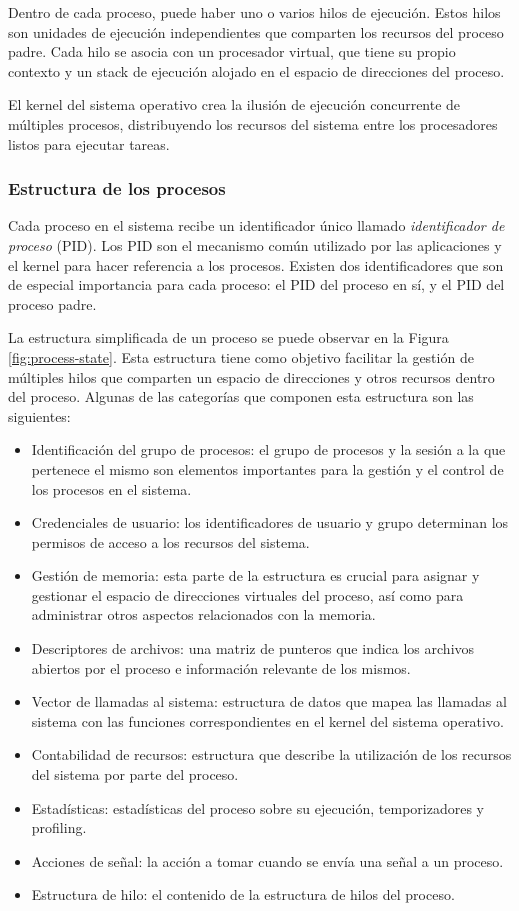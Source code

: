 Dentro de cada proceso, puede haber uno o varios hilos de ejecución. Estos hilos son unidades de ejecución independientes que comparten los recursos del proceso padre. Cada hilo se asocia con un procesador virtual, que tiene su propio contexto y un stack de ejecución alojado en el espacio de direcciones del proceso.\par

El kernel del sistema operativo crea la ilusión de ejecución concurrente de múltiples procesos, distribuyendo los recursos del sistema entre los procesadores listos para ejecutar tareas.\par

\subsubsection{Estructura de los procesos}
Cada proceso en el sistema recibe un identificador único llamado \textit{identificador de proceso} (PID). Los PID son el mecanismo común utilizado por las aplicaciones y el kernel para hacer referencia a los procesos. Existen dos identificadores que son de especial importancia para cada proceso: el PID del proceso en sí, y el PID del proceso padre.

La estructura simplificada de un proceso se puede observar en la Figura \ref{fig:process-state}. Esta estructura tiene como objetivo facilitar la gestión de múltiples hilos que comparten un espacio de direcciones y otros recursos dentro del proceso. Algunas de las categorías que componen esta estructura son las siguientes:

\begin{itemize}
    \item Identificación del grupo de procesos: el grupo de procesos y la sesión a la que pertenece el mismo son elementos importantes para la gestión y el control de los procesos en el sistema.
    \item Credenciales de usuario: los identificadores de usuario y grupo determinan los permisos de acceso a los recursos del sistema.
    \item Gestión de memoria: esta parte de la estructura es crucial para asignar y gestionar el espacio de direcciones virtuales del proceso, así como para administrar otros aspectos relacionados con la memoria.
    \item Descriptores de archivos: una matriz de punteros que indica los archivos abiertos por el proceso e información relevante de los mismos.
    \item Vector de llamadas al sistema: estructura de datos que mapea las llamadas al sistema con las funciones correspondientes en el kernel del sistema operativo.
    \item Contabilidad de recursos: estructura que describe la utilización de los recursos del sistema por parte del proceso.
    \item Estadísticas: estadísticas del proceso sobre su ejecución, temporizadores y profiling.
    \item Acciones de señal: la acción a tomar cuando se envía una señal a un proceso.
    \item Estructura de hilo: el contenido de la estructura de hilos del proceso.
\end{itemize}

